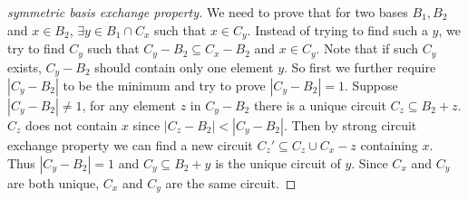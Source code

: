 \documentclass[12pt]{article}
\begin{document}
\begin{proof}[symmetric basis exchange property]\label{prf:sym_base_exchange}
We need to prove that for two bases $B_1,B_2$ and $x\in B_2$, $\exists y\in B_1\cap C_x$ such that $x\in C_y$. Instead of trying to find such a $y$, we try to find $C_y$ such that $C_y-B_2\subseteq C_x-B_2$ and $x\in C_y$. Note that if such $C_y$ exists, $C_y -B_2$ should contain only one element $y$. So first we further require $|C_y-B_2|$ to be the minimum and try to prove $|C_y-B_2|=1$. Suppose $|C_y-B_2|\not =1$, for any element $z$ in $C_y-B_2$ there is a unique circuit $C_z\subseteq B_2+z$. $C_z$ does not contain $x$ since $|C_z-B_2|<|C_y-B_2|$. Then by strong circuit exchange property we can find a new circuit $C_z'\subseteq C_z\cup C_x-z$ containing $x$. Thus $|C_y-B_2|=1$ and $C_y\subseteq B_2+y$ is the unique circuit of $y$. Since $C_x$ and $C_y$ are both unique, $C_x$ and $C_y$ are the same circuit.
\end{proof}
\end{document}
